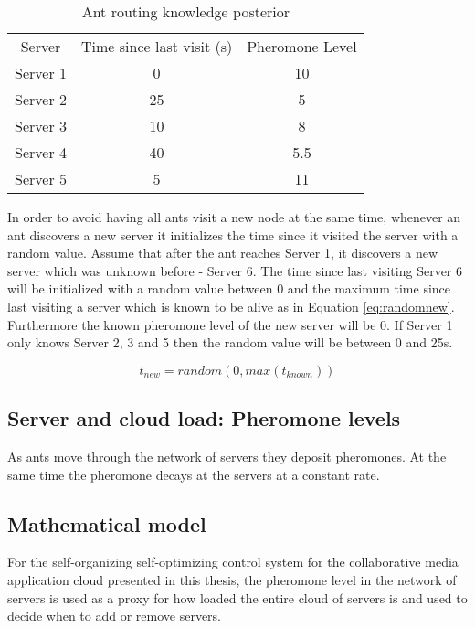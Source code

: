 \begin{table}
\centering
\begin{tabular}{c|c|c}
Server & Time since last visit (s) & Pheromone Level \\
Server 1 & 0 & 10 \\
Server 2 & 25 & 5 \\
Server 3 & 10 & 8 \\
Server 4 & 40 & 5.5 \\
Server 5 & 5 & 11 \\
\end{tabular}
\caption{Ant routing knowledge posterior}
\label{tab:ant_post}
\end{table}

In order to avoid having all ants visit a new node at the same time, whenever an ant discovers a new server it initializes the time since it visited the server with a random value. Assume that after the ant reaches Server 1, it discovers a new server which was unknown before - Server 6. The time since last visiting Server 6 will be initialized with a random value between 0 and the maximum time since last visiting a server which is known to be alive as in Equation \ref{eq:randomnew}. Furthermore the known pheromone level of the new server will be 0. If Server 1 only knows Server 2, 3 and 5 then the random value will be between 0 and 25s.

\begin{equation}
t_{new} = random(0, max(t_{known}))
\label{eq:randomnew}
\end{equation}

\subsection{Server and cloud load: Pheromone levels}

As ants move through the network of servers they deposit pheromones. At the same time the pheromone decays at the servers at a constant rate.

\subsection{Mathematical model}


For the self-organizing self-optimizing control system for the collaborative media application cloud presented in this thesis, the pheromone level in the network of servers is used as a proxy for how loaded the entire cloud of servers is and used to decide when to add or remove servers. 

